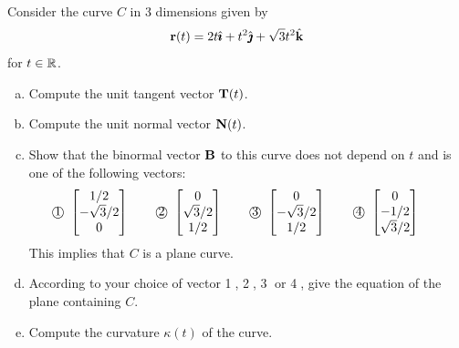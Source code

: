\begin{question}[M317 2016A]  %
Consider the curve $C$ in 3 dimensions given by
\begin{equation*}
\mathbf{r}(t) = 2t\hat{\pmb{\imath}} + t^2\hat{\pmb{\jmath}} + \sqrt{3} t^2\hat{\mathbf{k}}
\end{equation*}
for $t \in\mathbb{R}$.

\begin{enumerate}[(a)]
\item
Compute the unit tangent vector $\mathbf{T}(t)$.

\item
Compute the unit normal vector $\mathbf{N}(t)$.


\item 
Show that the binormal vector $\mathbf{B}$ to this curve does not depend on 
$t$ and is one of the following vectors:
\begin{equation*}
\text{\textcircled{1}}\ \left[\begin{matrix}
                  1/2 \\
                  -\sqrt{3}/2 \\
                 0
                \end{matrix}\right]\qquad
\text{\textcircled{2}}\ \left[\begin{matrix}
                  0  \\
                  \sqrt{3}/2 \\
                  1/2
                \end{matrix}\right]\qquad
\text{\textcircled{3}}\ \left[\begin{matrix}
                  0 \\
                  -\sqrt{3}/2 \\
                  1/2
                \end{matrix}\right]\qquad
\text{\textcircled{4}}\ \left[\begin{matrix}
                  0\\
                  -1/2 \\
                  \sqrt{3}/2 
                \end{matrix}\right]\qquad
\end{equation*}
This implies that $C$ is a plane curve.

\item
According to your choice of vector \textcircled{1}, \textcircled{2},
\textcircled{3} or \textcircled{4}, give the equation of the plane
containing $C$.

\item
Compute the curvature $\kappa(t)$ of the curve.



\end{enumerate}
\end{question}
